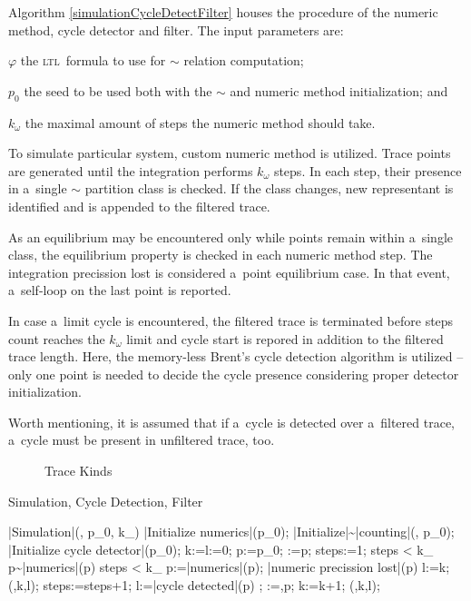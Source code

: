 \documentclass[12pt,oneside,draft]{fithesis}
\newcommand{\ltl}{\textsc{ltl}~}
\begin{document}
Algorithm \ref{simulationCycleDetectFilter} houses the procedure of
the numeric method, cycle detector and filter. The input parameters are:
\begin{inparaenum}
	\item{$\varphi$} the \ltl formula to use for $\sim$ relation
		computation;
	\item{$p_0$} the seed to be used both with the $\sim$ and numeric
		method initialization; and
	\item{$k_{\omega}$} the maximal amount of steps the numeric method
		should take.
\end{inparaenum}

To simulate particular system, custom numeric method is utilized.
Trace points are generated until the integration performs $k_{\omega}$
steps. In each step, their presence in a~single $\sim$ partition class
is checked. If the class changes, new representant is identified
and is appended to the filtered trace.

As an equilibrium may be encountered only while points remain within
a~single class, the equilibrium property is checked in each numeric
method step. The integration precission lost is considered a~point
equilibrium case. In that event, a~self-loop on the last point is
reported.

In case a~limit cycle is encountered, the filtered trace is terminated
before steps count reaches the $k_{\omega}$ limit and cycle start is
repored in addition to the filtered trace length. Here, the memory-less
Brent's cycle detection algorithm is utilized\cite{wloop,brent}
-- only one point is needed to decide the cycle presence considering
proper detector initialization.

Worth mentioning, it is assumed that if a~cycle is detected over
a~filtered trace, a~cycle must be present in unfiltered trace, too.

\begin{figure}
\label{fig:trace:kinds}
\caption{Trace Kinds}
\end{figure}


\begin{algorithm}
	\caption{Simulation, Cycle Detection, Filter}
	\label{simulationCycleDetectFilter}
	\begin{program}
			\PROC |Simulation|(\varphi, p_0, k_{\omega}) \BODY
			|Initialize numerics|(p_0);
			|Initialize|\sim|counting|(\varphi, p_0);
			|Initialize cycle detector|(p_0);
			k:=l:=0;
			p:=p_0;
			\tilde{\pi}:=p;
			steps:=1;
			\WHILE steps < k_{\omega}
			\DO
				\WHILE p\sim|numerics|(p) \wedge steps < k_{\omega}
				\DO
					p:=|numerics|(p);
					\IF |numeric precission lost|(p)
					\THEN
						l:=k;
						(\tilde{\pi},k,l);
					\FI
					steps:=steps+1;
				\OD
				\IF l:=|cycle detected|(p)
				\THEN
					;
				\FI
				\tilde{\pi}:=\tilde{\pi},p;
				k:=k+1;\rcomment{new representant}
			\OD
			(\tilde{\pi},k,l);
			\ENDPROC
	\end{program}
\end{algorithm}
\end{document}
